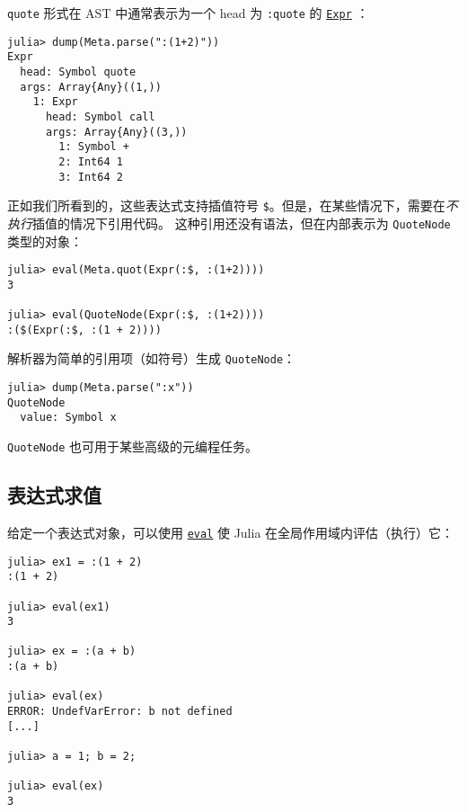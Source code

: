 \texttt{quote} 形式在 AST 中通常表示为一个 head 为 \texttt{:quote} 的 \hyperlink{17120496304147995299}{\texttt{Expr}} ：




\begin{verbatim}
julia> dump(Meta.parse(":(1+2)"))
Expr
  head: Symbol quote
  args: Array{Any}((1,))
    1: Expr
      head: Symbol call
      args: Array{Any}((3,))
        1: Symbol +
        2: Int64 1
        3: Int64 2
\end{verbatim}



正如我们所看到的，这些表达式支持插值符号 \texttt{\$}。但是，在某些情况下，需要在\emph{不执行}插值的情况下引用代码。 这种引用还没有语法，但在内部表示为 \texttt{QuoteNode} 类型的对象：




\begin{verbatim}
julia> eval(Meta.quot(Expr(:$, :(1+2))))
3

julia> eval(QuoteNode(Expr(:$, :(1+2))))
:($(Expr(:$, :(1 + 2))))
\end{verbatim}



解析器为简单的引用项（如符号）生成 \texttt{QuoteNode}：




\begin{verbatim}
julia> dump(Meta.parse(":x"))
QuoteNode
  value: Symbol x
\end{verbatim}



\texttt{QuoteNode} 也可用于某些高级的元编程任务。



\hypertarget{6779457931563322820}{}


\subsection{表达式求值}



给定一个表达式对象，可以使用 \hyperlink{7507639810592563424}{\texttt{eval}} 使 Julia 在全局作用域内评估（执行）它：




\begin{verbatim}
julia> ex1 = :(1 + 2)
:(1 + 2)

julia> eval(ex1)
3

julia> ex = :(a + b)
:(a + b)

julia> eval(ex)
ERROR: UndefVarError: b not defined
[...]

julia> a = 1; b = 2;

julia> eval(ex)
3
\end{verbatim}



